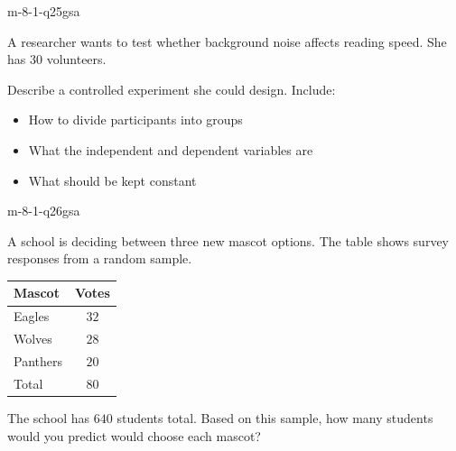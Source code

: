 \begin{practiceQuestion}{m-8-1-q25}{gsa}
\begin{questionText}
A researcher wants to test whether background noise affects reading speed. She has $30$ volunteers.

Describe a controlled experiment she could design. Include:
\begin{itemize}
\item How to divide participants into groups
\item What the independent and dependent variables are
\item What should be kept constant
\end{itemize}
\end{questionText}
\end{practiceQuestion}

\begin{practiceQuestion}{m-8-1-q26}{gsa}
\begin{questionText}
A school is deciding between three new mascot options. The table shows survey responses from a random sample.

\begin{center}
\begin{tabular}{|l|c|}
\hline
\textbf{Mascot} & \textbf{Votes} \\
\hline
Eagles & $32$ \\
Wolves & $28$ \\
Panthers & $20$ \\
\hline
Total & $80$ \\
\hline
\end{tabular}
\end{center}

The school has $640$ students total. Based on this sample, how many students would you predict would choose each mascot?
\end{questionText}
\end{practiceQuestion}

